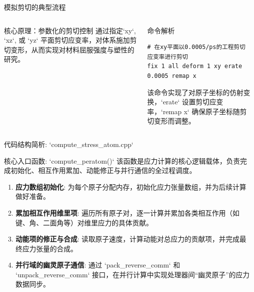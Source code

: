 \documentclass{beamer}
\begin{document}
\begin{frame}{模拟剪切的典型流程}
    \begin{columns}
        \begin{block}{核心原理：参数化的剪切控制}
            通过指定`xy`, `xz`, 或 `yz` 平面剪切应变率，对体系施加剪切变形，从而实现对材料屈服强度与塑性的研究。
        \end{block}
        \begin{block}{命令解析}
\begin{lstlisting}
# 在xy平面以0.0005/ps的工程剪切应变率进行剪切
fix 1 all deform 1 xy erate 0.0005 remap x
\end{lstlisting}
            该命令实现了对原子坐标的仿射变换，`erate` 设置剪切应变率，`remap x` 确保原子坐标随剪切变形而调整。
        \end{block}
    \end{columns}
\end{frame}

\begin{frame}{代码结构简析: `compute_stress_atom.cpp`}
    \begin{block}{核心入口函数: `compute_peratom()`}
        该函数是应力计算的核心逻辑载体，负责完成初始化、相互作用累加、动能修正与并行通信的全过程调度。
    \end{block}
    \begin{enumerate}
        \item \textbf{应力数组初始化}: 为每个原子分配内存，初始化应力张量数组，并为后续计算做好准备。
        \item \textbf{累加相互作用维里项}: 遍历所有原子对，逐一计算并累加各类相互作用（如键、角、二面角等）对维里应力的具体贡献。
        \item \textbf{动能项的修正与合成}: 读取原子速度，计算动能对总应力的贡献项，并完成最终应力张量的合成。
        \item \textbf{并行域的幽灵原子通信}: 通过 `pack_reverse_comm` 和 `unpack_reverse_comm` 接口，在并行计算中实现处理器间“幽灵原子”的应力数据同步。
    \end{enumerate}
\end{frame}
\end{document}
